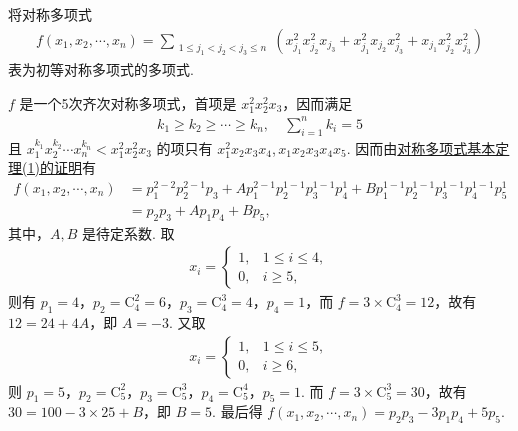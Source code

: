 \documentclass[../../main.tex]{subfiles}%
\begin{document}
\begin{example}
将对称多项式
\begin{align*}
f(x_1, x_2, \cdots, x_n) = \sum_{\substack{1 \leqslant j_1 < j_2 < j_3 \leqslant n}} \left( x_{j_1}^2 x_{j_2}^2 x_{j_3} + x_{j_1}^2 x_{j_2} x_{j_3}^2 + x_{j_1} x_{j_2}^2 x_{j_3}^2 \right)
\end{align*}
表为初等对称多项式的多项式.
\end{example}
\begin{solution}

\( f \) 是一个5次齐次对称多项式，首项是 \( x_1^2 x_2^2 x_3 \)，因而满足
\begin{align*}
k_1 \geqslant k_2 \geqslant \cdots \geqslant k_n, \quad \sum_{i=1}^n{k_i}=5
\end{align*}
且 \( x_1^{k_1} x_2^{k_2} \cdots x_n^{k_n} < x_1^2 x_2^2 x_3 \) 的项只有 \( x_1^2 x_2 x_3 x_4 \),$\,$\( x_1 x_2 x_3 x_4 x_5 \). 因而由\hyperref[theorem:抽象代数--定理2.3.1--对称多项式基本定理-1]{对称多项式基本定理(1)的证明}有
\begin{align*}
f(x_1, x_2, \cdots, x_n) &= p_1^{2-2} p_2^{2-1} p_3 + A p_1^{2-1} p_2^{1-1} p_3^{1-1} p_4^1 + B p_1^{1-1} p_2^{1-1} p_3^{1-1} p_4^{1-1} p_5^1 \\
&= p_2 p_3 + A p_1 p_4 + B p_5,
\end{align*}
其中，\( A, B \) 是待定系数.
取
\begin{align*}
x_i = \begin{cases}
1, & 1 \leqslant i \leqslant 4, \\
0, & i \geqslant 5,
\end{cases}
\end{align*}
则有 \( p_1 = 4 \)，\( p_2 = \mathrm{C}_4^2 = 6 \)，\( p_3 = \mathrm{C}_4^3 = 4 \)，\( p_4 = 1 \)，而 \( f = 3 \times \mathrm{C}_4^3 = 12 \)，故有 \( 12 = 24 + 4A \)，即 \( A = -3 \).
又取
\begin{align*}
x_i = \begin{cases}
1, & 1 \leqslant i \leqslant 5, \\
0, & i \geqslant 6,
\end{cases}
\end{align*}
则 \( p_1 = 5 \)，\( p_2 = \mathrm{C}_5^2 \)，\( p_3 = \mathrm{C}_5^3 \)，\( p_4 = \mathrm{C}_5^4 \)，\( p_5 = 1 \). 而 \( f = 3 \times \mathrm{C}_5^3 = 30 \)，故有 \( 30 = 100 - 3 \times 25 + B \)，即 \( B = 5 \). 最后得 \( f(x_1, x_2, \cdots, x_n) = p_2 p_3 - 3p_1 p_4 + 5p_5 \).

\end{solution}
\end{document}
